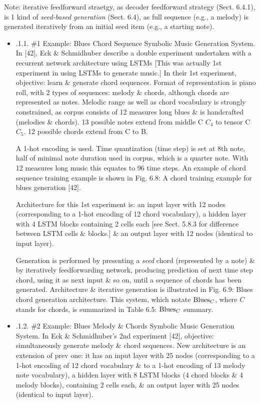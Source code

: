 \documentclass{article}
\begin{document}
\begin{itemize}
\begin{itemize}
\begin{itemize}
			Note: iterative feedforward straetgy, as decoder feedforward strategy (Sect. 6.4.1), is 1 kind of {\it seed-based generation} (Sect. 6.4), as full sequence (e.g., a melody) is generated iteratively from an initial seed item (e.g., a starting note).
			\begin{itemize}
				\item {.1.1. \#1 Example: Blues Chord Sequence Symbolic Music Generation System.} In [42], {\sc Eck \& Schmidhuber} describe a double experiment undertaken with a recurrent network architecture using LSTMs [This was actually 1st experiment in using LSTMs to generate music.] In their 1st experiment, objective: learn \& generate chord sequences. Format of representation is piano roll, with 2 types of sequences: melody \& chords, although chords are represented as notes. Melodic range as well as chord vocabulary is strongly constrained, as corpus consists of 12 measures long blues \& is handcrafted (melodies \& chords). 13 possible notes extend from middle C $C_4$ to tensor C $C_5$. 12 possible chords extend from C to B.
				
				A 1-hot encoding is used. Time quantization (time step) is set at 8th note, half of minimal note duration used in corpus, which is a quarter note. With 12 measures long music this equates to 96 time steps. An example of chord sequence training example is shown in {\sf Fig. 6.8: A chord training example for blues generation [42].}
				
				Architecture for this 1st experiment is: an input layer with 12 nodes (corresponding to a 1-hot encoding of 12 chord vocabulary), a hidden layer with 4 LSTM blocks containing 2 cells each [see Sect. 5.8.3 for difference between LSTM cells \& blocks.] \& an output layer with 12 nodes (identical to input layer).
				
				Generation is performed by presenting a {\it seed} chord (represented by a note) \& by iteratively feedforwarding network, producing prediction of next time step chord, using it as next input \& so on, until a sequence of chords has been generated. Architecture \& iterative generation is illustrated in {\sf Fig. 6.9: Blues chord generation architecture}. This system, which notate ${\rm Blues}_C$, where $C$ stands for chords, is summarized in {\sf Table 6.5: ${\rm Blues}_C$ summary.}
				\item {.1.2. \#2 Example: Blues Melody \& Chords Symbolic Music Generation System.} In {\sc Eck \& Schmidhuber}'s 2nd experiment [42], objective: simultaneously generate melody \& chord sequences. New architecture is an extension of prev one: it has an input layer with 25 nodes (corresponding to a 1-hot encoding of 12 chord vocabulary \& to a 1-hot encoding of 13 melody note vocabulary), a hidden layer with 8 LSTM blocks (4 chord blocks \& 4 melody blocks), containing 2 cells each, \& an output layer with 25 nodes (identical to input layer).
				

\end{itemize}
\end{itemize}
\end{itemize}
\end{itemize}
\end{document}
